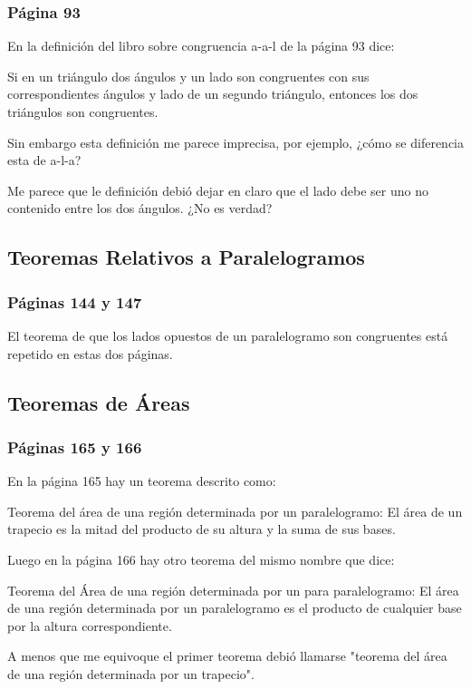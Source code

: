 \subsubsection{Página 93}

En la definición del libro sobre congruencia a-a-l de la página 93 dice:

Si en un triángulo dos ángulos y un lado son congruentes con sus correspondientes ángulos y lado de un segundo triángulo, entonces los dos triángulos son congruentes.

Sin embargo esta definición me parece imprecisa, por ejemplo, ¿cómo se diferencia esta de a-l-a?

Me parece que le definición debió dejar en claro que el lado debe ser uno no contenido entre los dos ángulos. ¿No es verdad?

\subsection{Teoremas Relativos a Paralelogramos}
\subsubsection{Páginas 144 y 147}

El teorema de que los lados opuestos de un paralelogramo son congruentes está repetido en estas dos páginas.

\subsection{Teoremas de Áreas}
\subsubsection{Páginas 165 y 166}

En la página 165 hay un teorema descrito como:

Teorema del área de una región determinada por un paralelogramo:
El área de un trapecio es la mitad del producto de su altura y la suma de sus bases.

Luego en la página 166 hay otro teorema del mismo nombre que dice:

Teorema del Área de una región determinada por un para paralelogramo:
El área de una región determinada por un paralelogramo es el producto de cualquier base por la altura correspondiente.

A menos que me equivoque el primer teorema debió llamarse "teorema del área de una región determinada por un trapecio".

